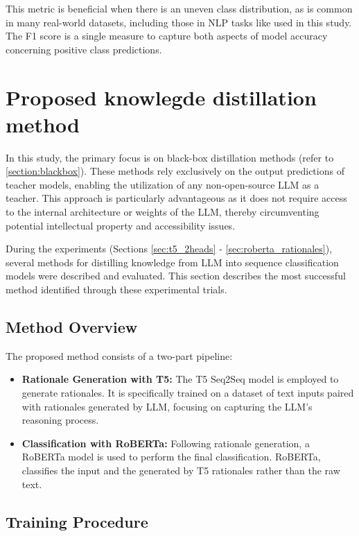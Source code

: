 This metric is beneficial when there is an uneven class distribution, as is common in many real-world datasets, including those in NLP tasks like used in this study. The F1 score is a single measure to capture both aspects of model accuracy concerning positive class predictions.


\section{Proposed knowlegde distillation method}
\label{sec:proposed_method}

In this study, the primary focus is on black-box distillation methods (refer to \autoref{section:blackbox}). These methods rely exclusively on the output predictions of teacher models, enabling the utilization of any non-open-source LLM as a teacher. This approach is particularly advantageous as it does not require access to the internal architecture or weights of the LLM, thereby circumventing potential intellectual property and accessibility issues.

During the experiments (Sections \ref{sec:t5_2heads} - \ref{sec:roberta_rationales}), several methods for distilling knowledge from LLM into sequence classification models were described and evaluated. This section describes the most successful method identified through these experimental trials.

\subsection*{Method Overview}

The proposed method consists of a two-part pipeline:
\begin{itemize}
    \item \textbf{Rationale Generation with T5:} The T5 Seq2Seq model is employed to generate rationales. It is specifically trained on a dataset of text inputs paired with rationales generated by LLM, focusing on capturing the LLM's reasoning process.
    \item \textbf{Classification with RoBERTa:} Following rationale generation, a RoBERTa model is used to perform the final classification. RoBERTa, classifies the input and the generated by T5 rationales rather than the raw text.
\end{itemize}

\subsection*{Training Procedure}


